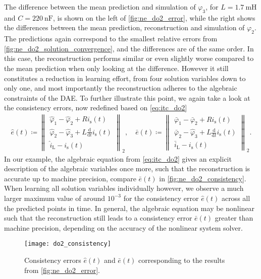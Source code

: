 \documentclass[AMA,STIX1COL]{WileyNJD-v2}
\newcommand{\mr}[1]{\mathrm{#1}}
\newcommand{\ddt}{\frac{\mathrm{d}}{\mathrm{d}t}}
\begin{document}
The difference between the mean prediction and simulation of $\varphi_3$, for $L = \SI{1.7}{\milli\henry}$ and $C = \SI{220}{\nano\farad}$, is shown on the left of \autoref{fig:ne_do2_error}, while the right shows the differences between the mean prediction, reconstruction and simulation of $\varphi_2$. The predictions again correspond to the smallest relative errors from \autoref{fig:ne_do2_solution_convergence}, and the differences are of the same order. In this case, the reconstruction performs similar or even slightly worse compared to the mean prediction when only looking at the difference. However it still constitutes a reduction in learning effort, from four solution variables down to only one, and most importantly the reconstruction adheres to the algebraic constraints of the DAE. To further illustrate this point, we again take a look at the consistency errors, now redefined based on \eqref{eq:itc_do2}
\begin{align*}
    \hat{e}(t) \coloneqq \begin{Vmatrix}
        \hat{\varphi}_1 - \hat{\varphi}_2 + R i_\mr{s}(t)\\
        \hat{\varphi}_2 - \hat{\varphi}_3 + L \ddt i_\mr{s}(t)\\
        \hat{i}_\mr{L} - i_\mr{s}(t)
    \end{Vmatrix}_2, \quad \bar{e}(t) \coloneqq \begin{Vmatrix}
        \bar{\varphi}_1 - \bar{\varphi}_2 + R i_\mr{s}(t)\\
        \bar{\varphi}_2 - \hat{\varphi}_3 + L \ddt i_\mr{s}(t)\\
        \bar{i}_\mr{L} - i_\mr{s}(t)
    \end{Vmatrix}_2.
\end{align*}
In our example, the algebraic equation from \eqref{eq:itc_do2} gives an explicit description of the algebraic variables once more, such that the reconstruction is accurate up to machine precision, compare $\bar{e}(t)$ in \autoref{fig:ne_do2_consistency}. When learning all solution variables individually however, we observe a much larger maximum value of around $10^{-3}$ for the consistency error $\hat{e}(t)$ across all the predicted points in time. In general, the algebraic equation may be nonlinear such that the reconstruction still leads to a consistency error $\bar{e}(t)$ greater than machine precision, depending on the accuracy of the nonlinear system solver.
\begin{figure}[b]
    \begin{center}
        \texttt{[image: do2\_consistency]}
    \end{center}
    \caption{Consistency errors $\hat{e}(t)$ and $\bar{e}(t)$ corresponding to the results from \autoref{fig:ne_do2_error}.}
    \label{fig:ne_do2_consistency}
\end{figure}
\end{document}
